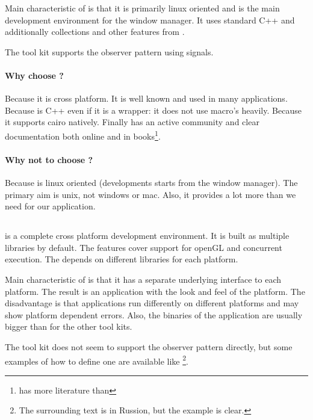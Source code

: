 Main characteristic of  is that it is primarily linux oriented and is
the main development environment for the  window manager. It uses
standard C++ and additionally collections and other features from .

The tool kit  supports the observer pattern using signals.

\paragraph{Why choose ?} Because it is cross platform. It is well
known and used in many applications. Because  is C++ even if it is a
wrapper: it does not use macro's heavily. Because it supports cairo natively.
Finally  has an active community and clear documentation both online
and in books\footnote{ has more literature than }.

\paragraph{Why not to choose ?} Because  is linux oriented
(developments starts from the  window manager). The primary aim is
unix, not windows or mac.  Also, it provides a lot more than we need for our
application.

\subsection{} 

 is a complete cross platform development environment. It is built
as multiple libraries by default. The features cover support for openGL and
concurrent execution. The  depends on different libraries for each
platform.

Main characteristic of  is that it has a separate underlying
interface to each platform. The result is an application with the look and feel
of the platform. The disadvantage is that applications run differently on
different platforms and may show platform dependent errors. Also, the binaries
of the application are usually bigger than for the other tool kits.

The tool kit  does not seem to support the observer pattern
directly, but some examples of how to define one are available like
\cite{wxwidget:observer-example}\footnote{The surrounding text is in Russion,
but the example is clear.}.


